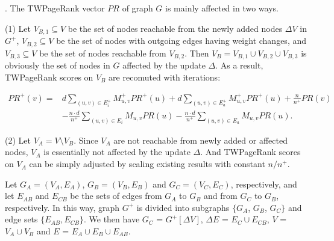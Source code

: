 

.
The TWPageRank vector $PR$ of graph $G$ is mainly affected in two ways.



\sstab(1) Let $V_{B,1}\subseteq V$ be the set of nodes reachable from the newly added nodes $\Delta V$ in $G^+$, $V_{B,2}\subseteq V$ be the set of nodes with outgoing edges having weight changes, and $V_{B,3}\subseteq V$ be the set of nodes reachable from  $V_{B,2}$.
%
Then $V_B=V_{B,1}\cup V_{B,2}\cup V_{B,3}$ is obviously the set of nodes in $G$ affected by the update $\Delta$.
%
As a result, TWPageRank scores on $V_B$ are recomuted with iterations: 
%
\begin{small}
\begin{equation}\label{eq-inc-prscc}
\begin{split}
PR^+(v) = &  d \sum_{(u,v)\in E^+_i} M^+_{u,v} PR^+(u) + d \sum_{(u,v)\in E^+_a} M^+_{u,v} PR^+(u) + \frac{n}{n^+} PR(v) \\
 & - \frac{n\cdot d}{n^+} \sum_{(u,v)\in E_i} M_{u,v} PR(u) - \frac{n\cdot d}{n^+} \sum_{(u,v)\in E_a} M_{u,v} PR(u).
\end{split}
\end{equation}
\end{small}

\sstab(2) Let $V_A = V\setminus V_B$. Since $V_A$ are not reachable from newly added or affected nodes, $V_A$ is essentially not affected by the update $\Delta$. And TWPageRank scores on $V_A$ can be simply adjusted by scaling existing results with constant ${n}/{n^+}$.

Let $G_A=(V_A,E_A)$, $G_B=(V_B,E_B)$ and $G_C=(V_C,E_C)$, respectively, and
let $E_{AB}$ and $E_{CB}$  be the sets of edges from $G_A$ to $G_B$ and from $G_C$ to $G_B$, respectively.
In this way, graph $G^+$ is divided into subgraphs $\{G_A$, $G_B$, $G_C\}$ and edge sets $\{E_{AB}, E_{CB}\}$.
%
We then have $G_C$ = $G^+[\Delta V]$, $\Delta E$ = $E_C\cup E_{CB}$, $V$ = $V_A\cup V_B$ and $E$ = $E_A\cup E_B\cup E_{AB}$.

